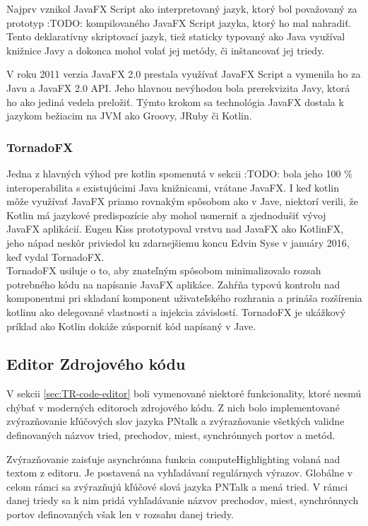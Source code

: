 Najprv vznikol JavaFX Script ako interpretovaný jazyk, ktorý bol považovaný za prototyp :TODO: kompilovaného JavaFX Script jazyka, ktorý ho mal nahradiť. Tento deklaratívny skriptovací jazyk, tiež staticky typovaný ako Java využíval knižnice Javy a dokonca mohol volať jej metódy, či inštancovať jej triedy. \cite{weaver2007javafx}

V roku 2011 verzia JavaFX 2.0 prestala využívať JavaFX Script a vymenila ho za Javu a JavaFX 2.0 API. \cite{dea2011javafx}Jeho hlavnou nevýhodou bola prerekvizita Javy, ktorá ho ako jediná vedela preložiť. Týmto krokom sa technológia JavaFX dostala k jazykom bežiacim na JVM ako Groovy, JRuby či Kotlin.

\subsubsection{TornadoFX}

Jedna z hlavných výhod pre kotlin spomenutá v sekcii :TODO: bola
jeho 100 \% interoperabilita s existujúcimi Java knižnicami, vrátane JavaFX. I keď kotlin môže využívať JavaFX priamo rovnakým spôsobom ako v Jave, niektorí verili, že Kotlin má jazykové predispozície aby mohol usmerniť a zjednodušiť vývoj JavaFX aplikácií. Eugen Kiss prototypoval vrstvu nad JavaFX ako KotlinFX, jeho nápad neskôr priviedol ku zdarnejšiemu koncu Edvin Syse v januáry 2016\cite{tornadofx}, keď vydal TornadoFX.
\\
TornadoFX usiluje o to, aby znateľným spôsobom minimalizovalo rozsah potrebného kódu na napísanie JavaFX aplikáce. Zahŕňa typovú kontrolu nad komponentmi pri skladaní komponent uživateľského rozhrania a prináša rozšírenia kotlinu ako delegované vlastnosti a injekcia závislostí. TornadoFX je ukážkový príklad ako Kotlin dokáže zúsporniť kód napísaný v Jave.

\subsection{Editor Zdrojového kódu}

V sekcii \ref{sec:TR-code-editor} boli vymenované niektoré funkcionality, ktoré nesmú chýbať v moderných editoroch zdrojového kódu. Z nich bolo implementované zvýrazňovanie kľúčových slov jazyka PNtalk a zvýrazňovanie všetkých validne definovaných názvov tried, prechodov, miest, synchrónnych portov a metód.

Zvýrazňovanie zaisťuje asynchrónna funkcia computeHighlighting volaná nad textom z editoru. Je postavená na vyhľadávaní regulárnych výrazov. Globálne v celom rámci sa zvýrazňujú kľúčové slová jazyka PNTalk a mená tried. V rámci danej triedy sa k nim pridá vyhľadávanie názvov prechodov, miest, synchrónnych portov definovaných však len v rozsahu danej triedy.

